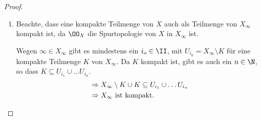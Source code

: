 \begin{proof}
\begin{enumerate}
\item
Beachte, dass eine kompakte Teilmenge von $X$ auch als Teilmenge von $X_\infty$
kompakt ist, da $\OO_X$ die Spurtopologie von $X$ in $X_\infty$ ist.

Wegen $\infty\in X_\infty$ gibt es mindestens ein $i_o\in\II$, mit $U_{i_0} =
X_\infty \setminus K$ für eine kompakte Teilmenge $K$ von $X_\infty$. Da $K$
kompakt ist, gibt es auch ein $n\in\N$, so dass $K\subseteq U_{i_1}\cup \ldots
U_{i_n}$.
\begin{align*}
&\Rightarrow X_\infty \setminus K \cup K \subseteq U_{i_1}\cup \ldots
U_{i_n}\\
&\Rightarrow X_\infty \text{ ist kompakt}.\qedhere
\end{align*}
\end{enumerate}
\end{proof}
